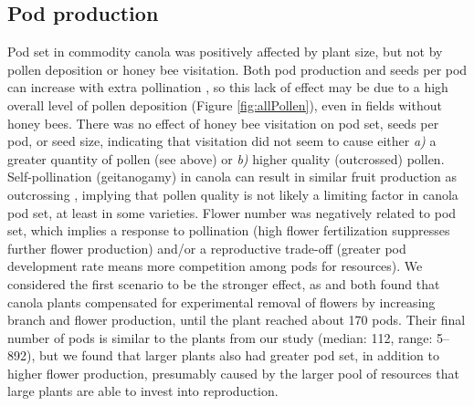 \documentclass[12pt]{article} %
\begin{document}
\subsection{Pod production} %
Pod set in commodity canola was positively affected by plant size, but not by pollen deposition or honey bee visitation.
Both pod production and seeds per pod can increase with extra pollination \citep{jauker2008,sabbahi2005,sabbahi2006,duran2010}, so this lack of effect may be due to a high overall level of pollen deposition (Figure \ref{fig:allPollen}), even in fields without honey bees.
There was no effect of honey bee visitation on pod set, seeds per pod, or seed size, indicating that visitation did not seem to cause either \textit{a)} a greater quantity of pollen (see above) or \textit{b)} higher quality (outcrossed) pollen.
Self-pollination (geitanogamy) in canola can result in similar fruit production as outcrossing \citep{rosa2011}, implying that pollen quality is not likely a limiting factor in canola pod set, at least in some varieties.
Flower number was negatively related to pod set, which implies a response to pollination (high flower fertilization suppresses further flower production) and/or a reproductive trade-off (greater pod development rate means more competition among pods for resources).
We considered the first scenario to be the stronger effect, as \citet{sabbahi2006} and \citet{mesquida1981} both found that canola plants compensated for experimental removal of flowers by increasing branch and flower production, until the plant reached about 170 pods.
Their final number of pods is similar to the plants from our study (median: 112, range: 5--892), but we found that larger plants also had greater pod set, in addition to higher flower production, presumably caused by the larger pool of resources that large plants are able to invest into reproduction. 
\end{document}
